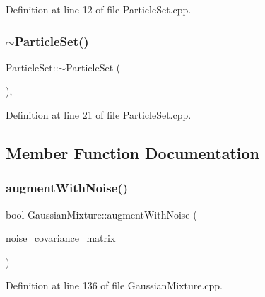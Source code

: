Definition at line 12 of file Particle\+Set.\+cpp.

\mbox{\label{classbfl_1_1ParticleSet_aa49ff9b36c641e3bc5dce28b0ae83180}} 
\subsubsection{\texorpdfstring{$\sim$\+Particle\+Set()}{~ParticleSet()}}
{\footnotesize\ttfamily Particle\+Set\+::$\sim$\+Particle\+Set (\begin{DoxyParamCaption}{ }\end{DoxyParamCaption})\hspace{0.3cm}{\ttfamily [virtual]}, {\ttfamily [noexcept]}}



Definition at line 21 of file Particle\+Set.\+cpp.



\subsection{Member Function Documentation}
\mbox{\label{classbfl_1_1GaussianMixture_aec4e807341e18c18faed041c41121cb7}} 
\subsubsection{\texorpdfstring{augment\+With\+Noise()}{augmentWithNoise()}}
{\footnotesize\ttfamily bool Gaussian\+Mixture\+::augment\+With\+Noise (\begin{DoxyParamCaption}\item[{const Eigen\+::\+Ref$<$ const Eigen\+::\+Matrix\+Xd $>$ \&}]{noise\+\_\+covariance\+\_\+matrix }\end{DoxyParamCaption})\hspace{0.3cm}{\ttfamily [inherited]}}



Definition at line 136 of file Gaussian\+Mixture.\+cpp.



